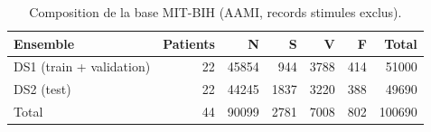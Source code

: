 \begin{table}
\caption{Composition de la base MIT-BIH (AAMI, records stimules exclus).}
\label{tab:dataset}
\begin{tabular}{lrrrrrr}
\toprule
Ensemble & Patients & N & S & V & F & Total \\
\midrule
DS1 (train + validation) & 22 & 45854 & 944 & 3788 & 414 & 51000 \\
DS2 (test) & 22 & 44245 & 1837 & 3220 & 388 & 49690 \\
Total & 44 & 90099 & 2781 & 7008 & 802 & 100690 \\
\bottomrule
\end{tabular}
\end{table}
